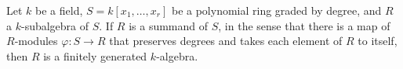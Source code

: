 \begin{cor}
    \label{invariantsfiniteness}
    Let $k$ be a field, $S=k[x_1,\ldots,x_r]$ be a polynomial ring graded by degree, and $R$ a $k$-subalgebra
    of $S$. If $R$ is a summand of $S$, in the sense that there is a map of $R$-modules $\varphi:S\to R$ that
    preserves degrees and takes each element of $R$ to itself, then $R$ is a finitely generated $k$-algebra.
\end{cor}